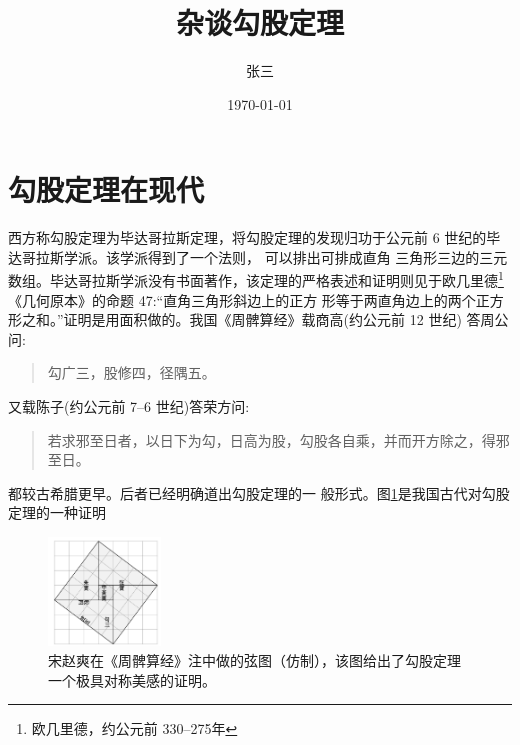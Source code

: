 \documentclass[UTF8]{ctexart}
\title{\heiti 杂谈勾股定理}
\author{\kaishu 张三}
\date{\today}
\begin{document}

\maketitle
\tableofcontents
\section{勾股定理在现代}\label{sec:first}
	西方称勾股定理为毕达哥拉斯定理，将勾股定理的发现归功于公元前 6 世纪的毕达哥拉斯学派\cite{Kline}。该学派得到了一个法则，
	可以排出可排成直角 三角形三边的三元数组。毕达哥拉斯学派没有书面著作，该定理的严格表述和证明则见于欧几里德\footnote{欧几里德，约公元前 330--275年}
	《几何原本》的命题 47:“直角三角形斜边上的正方 形等于两直角边上的两个正方形之和。”证明是用面积做的。我国《周髀算经》载商高(约公元前 12 世纪) 答周公问:
	\begin{quote}
		\kaishu 勾广三，股修四，径隅五。
	\end{quote}
	又载陈子(约公元前 7–6 世纪)答荣方问:
	\begin{quote}
		\kaishu 若求邪至日者，以日下为勾，日高为股，勾股各自乘，并而开方除之，得邪至日。
	\end{quote}
	都较古希腊更早。后者已经明确道出勾股定理的一 般形式。图\ref{fig:xiantu}是我国古代对勾股定理的一种证明\cite{quanjing}
	
	\begin{figure}[ht]
		\centering
		\includegraphics[width=3cm]{goutu.png}
		\caption{宋赵爽在《周髀算经》注中做的弦图（仿制），该图给出了勾股定理一个极具对称美感的证明。}
		\label{fig:xiantu}
	\end{figure}
\end{document}
